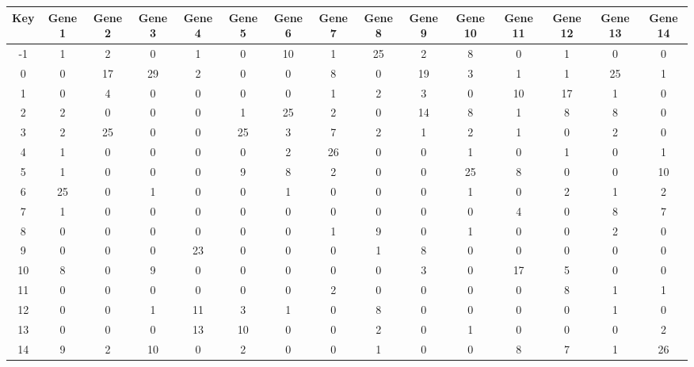\begin{tabular}{|c|c|c|c|c|c|c|c|c|c|c|c|c|c|c|}
\hline
Key & Gene 1 & Gene 2 & Gene 3 & Gene 4 & Gene 5 & Gene 6 & Gene 7 & Gene 8 & Gene 9 & Gene 10 & Gene 11 & Gene 12 & Gene 13 & Gene 14 \\
\hline
-1 & 1 & 2 & 0 & 1 & 0 & 10 & 1 & 25 & 2 & 8 & 0 & 1 & 0 & 0 \\
0 & 0 & 17 & 29 & 2 & 0 & 0 & 8 & 0 & 19 & 3 & 1 & 1 & 25 & 1 \\
1 & 0 & 4 & 0 & 0 & 0 & 0 & 1 & 2 & 3 & 0 & 10 & 17 & 1 & 0 \\
2 & 2 & 0 & 0 & 0 & 1 & 25 & 2 & 0 & 14 & 8 & 1 & 8 & 8 & 0 \\
3 & 2 & 25 & 0 & 0 & 25 & 3 & 7 & 2 & 1 & 2 & 1 & 0 & 2 & 0 \\
4 & 1 & 0 & 0 & 0 & 0 & 2 & 26 & 0 & 0 & 1 & 0 & 1 & 0 & 1 \\
5 & 1 & 0 & 0 & 0 & 9 & 8 & 2 & 0 & 0 & 25 & 8 & 0 & 0 & 10 \\
6 & 25 & 0 & 1 & 0 & 0 & 1 & 0 & 0 & 0 & 1 & 0 & 2 & 1 & 2 \\
7 & 1 & 0 & 0 & 0 & 0 & 0 & 0 & 0 & 0 & 0 & 4 & 0 & 8 & 7 \\
8 & 0 & 0 & 0 & 0 & 0 & 0 & 1 & 9 & 0 & 1 & 0 & 0 & 2 & 0 \\
9 & 0 & 0 & 0 & 23 & 0 & 0 & 0 & 1 & 8 & 0 & 0 & 0 & 0 & 0 \\
10 & 8 & 0 & 9 & 0 & 0 & 0 & 0 & 0 & 3 & 0 & 17 & 5 & 0 & 0 \\
11 & 0 & 0 & 0 & 0 & 0 & 0 & 2 & 0 & 0 & 0 & 0 & 8 & 1 & 1 \\
12 & 0 & 0 & 1 & 11 & 3 & 1 & 0 & 8 & 0 & 0 & 0 & 0 & 1 & 0 \\
13 & 0 & 0 & 0 & 13 & 10 & 0 & 0 & 2 & 0 & 1 & 0 & 0 & 0 & 2 \\
14 & 9 & 2 & 10 & 0 & 2 & 0 & 0 & 1 & 0 & 0 & 8 & 7 & 1 & 26 \\
\hline
\end{tabular}